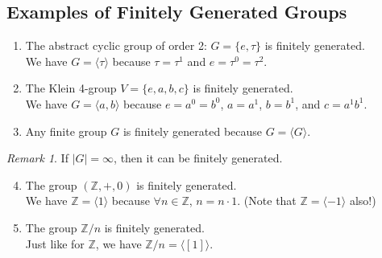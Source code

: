 \documentclass{article}
\newcommand{\Z}{\mathbb{Z}}
\theoremstyle{definition}
\theoremstyle{remark}
\newtheorem*{rmk}{Remark}
\begin{document}
{        \subsection*{Examples of Finitely Generated Groups}{
            \begin{enumerate}
                \item The abstract cyclic group of order 2: $G=\{e,\tau\}$ is finitely generated.\\
                We have $G=\langle \tau\rangle$ because $\tau=\tau^1$ and $e=\tau^0=\tau^2$.
                \item The Klein 4-group $V=\{e,a,b,c\}$ is finitely generated.\\
                We have $G=\langle a,b\rangle$ because $e=a^0=b^0$, $a=a^1$, $b=b^1$, and $c=a^1b^1$.
                \item Any finite group $G$ is finitely generated because $G=\langle G\rangle$.
            \end{enumerate} 
            
            \begin{rmk}
                If $|G|= \infty$, then it can be finitely generated.
            \end{rmk}
            
            \begin{enumerate}\setcounter{enumi}{3}
                \item The group $(\Z,+,0)$ is finitely generated.\\
                We have $\Z=\langle1\rangle$ because $\forall n \in \Z$, $n=n\cdot 1$. (Note that $\Z=\langle-1\rangle$ also!)
                \item The group $\Z/n$ is finitely generated.\\
                Just like for $\Z$, we have $\Z/n=\langle[1]\rangle$.
            \end{enumerate}
            
}}
\end{document}
